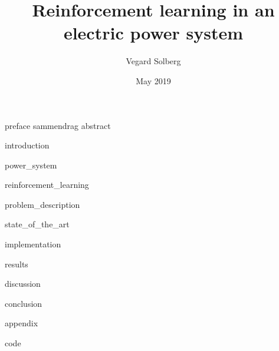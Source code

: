 \documentclass[11pt]{book}
\title{Reinforcement learning in an electric power system}
\author{Vegard Solberg}
\date{May 2019}
\begin{document}
    \frontmatter
    {preface}
    {sammendrag}
    {abstract}
    
    \tableofcontents
    
    \mainmatter
    {introduction}
    
    {power_system}
 
    {reinforcement_learning}
    
    {problem_description}
    
    {state_of_the_art}
    
    {implementation}
    
    
    {results}
    
    {discussion}

    {conclusion}

    \printbibliography

    \appendix
    {appendix}
    
    {code}
    
\end{document}
